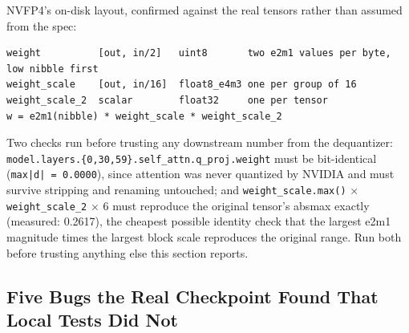 \documentclass[11pt]{article}
\begin{document}
NVFP4's on-disk layout, confirmed against the real tensors rather than assumed from the
spec:

\begin{lstlisting}
weight          [out, in/2]   uint8       two e2m1 values per byte, low nibble first
weight_scale    [out, in/16]  float8_e4m3 one per group of 16
weight_scale_2  scalar        float32     one per tensor
w = e2m1(nibble) * weight_scale * weight_scale_2
\end{lstlisting}

Two checks run before trusting any downstream number from the dequantizer:
\texttt{model.layers.\{0,30,59\}.self\_attn.q\_proj.weight} must be bit-identical
(\texttt{max|d| = 0.0000}), since attention was never quantized by NVIDIA and must
survive stripping and renaming untouched; and \texttt{weight\_scale.max()} $\times$
\texttt{weight\_scale\_2} $\times$ 6 must reproduce the original tensor's absmax exactly
(measured: 0.2617), the cheapest possible identity check that the largest e2m1
magnitude times the largest block scale reproduces the original range. Run both before
trusting anything else this section reports.

\subsection{Five Bugs the Real Checkpoint Found That Local Tests Did Not}
\end{document}
